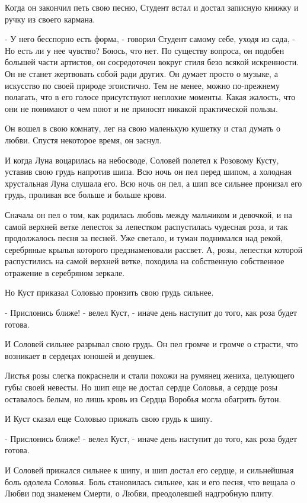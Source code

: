 \documentclass[a4paper]{article}
\theoremstyle{defin}
\theoremstyle{theorem}
\theoremstyle{prop}
\theoremstyle{lemma}
\theoremstyle{ex}
\theoremstyle{col}
\begin{document}
Когда он закончил петь свою песню, Студент встал и достал записную книжку и ручку из своего кармана.

- У него бесспорно есть форма, - говорил Студент самому себе, уходя из сада, - Но есть ли у нее чувство? Боюсь, что нет. По существу вопроса, он подобен большей части артистов, он сосредоточен вокруг стиля безо всякой искренности. Он не станет жертвовать собой ради других. Он думает просто о музыке, а искусство по своей природе эгоистично. Тем не менее, можно по-прежнему полагать, что в его голосе присутствуют неплохие моменты. Какая жалость, что они не понимают о чем поют и не приносят никакой практической пользы.

Он вошел в свою комнату, лег на свою маленькую кушетку и стал думать о любви. Спустя некоторое время, он заснул.

И когда Луна воцарилась на небосводе, Соловей полетел к Розовому Кусту, уставив свою грудь напротив шипа. Всю ночь он пел перед шипом, а холодная хрустальная Луна слушала его. Всю ночь он пел, а шип все сильнее пронизал его грудь, проливая все больше и больше крови.

Сначала он пел о том, как родилась любовь между мальчиком и девочкой, и на самой верхней ветке лепесток за лепестком распустилась чудесная роза, и так продолжалось песня за песней. Уже светало, и туман поднимался над рекой, серебряные крылья которого предзнаменовали рассвет. А, розы, лепестки которой распустились на самой верхней ветке, походила на собственную собственное отражение в серебряном зеркале.

Но Куст приказал Соловью пронзить свою грудь сильнее.

- Прислонись ближе! - велел Куст, - иначе день наступит до того, как роза будет готова.

И Соловей сильнее разрывал свою грудь. Он пел громче и громче о страсти, что возникает в сердецах юношей и девушек.

Листья розы слегка покраснели и стали похожи на румянец жениха, целующего губы своей невесты. Но шип еще не достал сердце Соловья, а сердце розы оставалось белым, но лишь кровь из Сердца Воробья могла обагрить бутон.

И Куст сказал еще Соловью прижать свою грудь к шипу.

- Прислонись ближе! - велел Куст, - иначе день наступит до того, как роза будет готова.

И Соловей прижался сильнее к шипу, и шип достал его сердце, и сильнейшная боль одолела Соловья. Боль становилась сильнее, как и его песня, что вещала о Любви под знаменем Смерти, о Любви, преодолевшей надгробную плиту.
\end{document}
